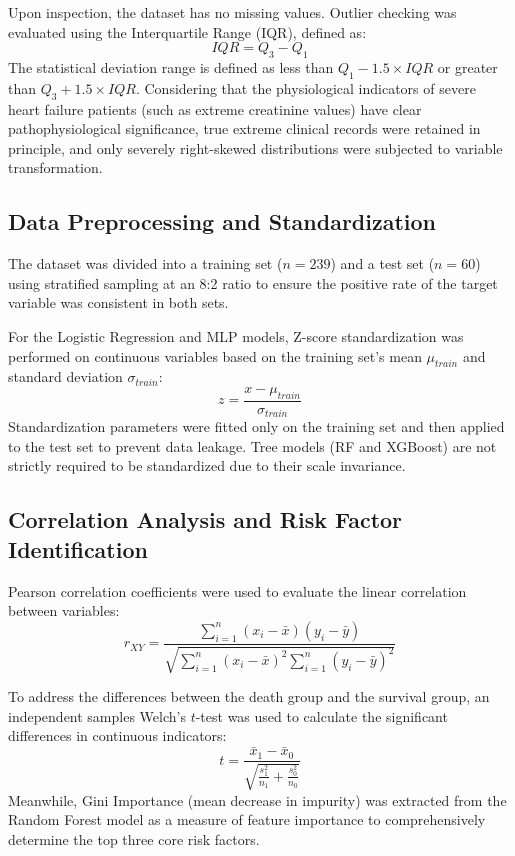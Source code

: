 \documentclass[12pt, a4paper]{article}
\begin{document}
Upon inspection, the dataset has no missing values. Outlier checking was evaluated using the Interquartile Range (IQR), defined as:
\begin{equation}
IQR = Q_3 - Q_1
\end{equation}
The statistical deviation range is defined as less than $Q_1 - 1.5 \times IQR$ or greater than $Q_3 + 1.5 \times IQR$. Considering that the physiological indicators of severe heart failure patients (such as extreme creatinine values) have clear pathophysiological significance, true extreme clinical records were retained in principle, and only severely right-skewed distributions were subjected to variable transformation.

\subsection{Data Preprocessing and Standardization}
The dataset was divided into a training set ($n=239$) and a test set ($n=60$) using stratified sampling at an 8:2 ratio to ensure the positive rate of the target variable was consistent in both sets.

For the Logistic Regression and MLP models, Z-score standardization was performed on continuous variables based on the training set's mean $\mu_{train}$ and standard deviation $\sigma_{train}$:
\begin{equation}
z = \frac{x - \mu_{train}}{\sigma_{train}}
\end{equation}
Standardization parameters were fitted only on the training set and then applied to the test set to prevent data leakage. Tree models (RF and XGBoost) are not strictly required to be standardized due to their scale invariance.

\subsection{Correlation Analysis and Risk Factor Identification}
Pearson correlation coefficients were used to evaluate the linear correlation between variables:
\begin{equation}
r_{XY} = \frac{\sum_{i=1}^{n}(x_i - \bar{x})(y_i - \bar{y})}{\sqrt{\sum_{i=1}^{n}(x_i - \bar{x})^2 \sum_{i=1}^{n}(y_i - \bar{y})^2}}
\end{equation}

To address the differences between the death group and the survival group, an independent samples Welch's $t$-test was used to calculate the significant differences in continuous indicators:
\begin{equation}
t = \frac{\bar{x}_1 - \bar{x}_0}{\sqrt{\frac{s_1^2}{n_1} + \frac{s_0^2}{n_0}}}
\end{equation}
Meanwhile, Gini Importance (mean decrease in impurity) was extracted from the Random Forest model as a measure of feature importance to comprehensively determine the top three core risk factors.
\end{document}
